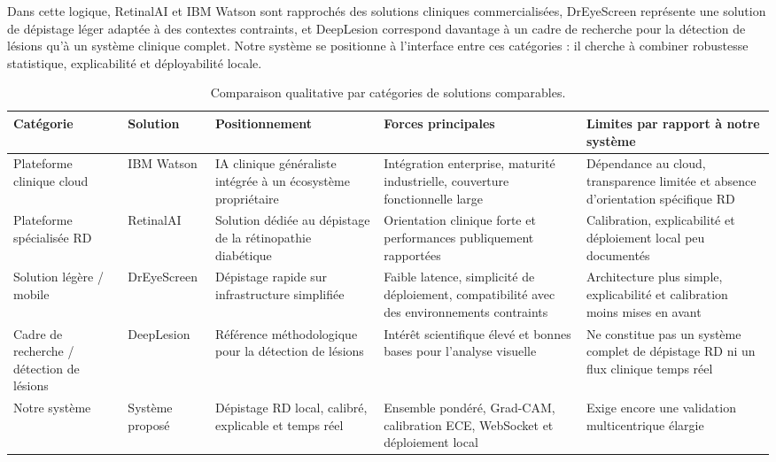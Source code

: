 \documentclass[12pt,a4paper,oneside]{report}
\begin{document}
Dans cette logique, RetinalAI et IBM Watson sont rapprochés des solutions
cliniques commercialisées, DrEyeScreen représente une solution de dépistage
léger adaptée à des contextes contraints, et DeepLesion correspond davantage à
un cadre de recherche pour la détection de lésions qu'à un système clinique
complet. Notre système se positionne à l'interface entre ces catégories : il
cherche à combiner robustesse statistique, explicabilité et déployabilité
locale.

\begin{table}[H]
\centering
\renewcommand{\arraystretch}{1.25}
\caption{Comparaison qualitative par catégories de solutions comparables.}
\label{tab:comparative_apps}
\begin{tabular}{|p{2.6cm}|p{2.7cm}|p{2.8cm}|p{3.0cm}|p{3.1cm}|}
\hline
\textbf{Catégorie} & \textbf{Solution} & \textbf{Positionnement} & \textbf{Forces principales} & \textbf{Limites par rapport à notre système} \\
\hline
Plateforme clinique cloud & IBM Watson & IA clinique généraliste intégrée à un écosystème propriétaire & Intégration enterprise, maturité industrielle, couverture fonctionnelle large & Dépendance au cloud, transparence limitée et absence d'orientation spécifique RD \\
\hline
Plateforme spécialisée RD & RetinalAI & Solution dédiée au dépistage de la rétinopathie diabétique & Orientation clinique forte et performances publiquement rapportées & Calibration, explicabilité et déploiement local peu documentés \\
\hline
Solution légère / mobile & DrEyeScreen & Dépistage rapide sur infrastructure simplifiée & Faible latence, simplicité de déploiement, compatibilité avec des environnements contraints & Architecture plus simple, explicabilité et calibration moins mises en avant \\
\hline
Cadre de recherche / détection de lésions & DeepLesion & Référence méthodologique pour la détection de lésions & Intérêt scientifique élevé et bonnes bases pour l'analyse visuelle & Ne constitue pas un système complet de dépistage RD ni un flux clinique temps réel \\
\hline
Notre système & Système proposé & Dépistage RD local, calibré, explicable et temps réel & Ensemble pondéré, Grad-CAM, calibration ECE, WebSocket et déploiement local & Exige encore une validation multicentrique élargie \\
\hline
\end{tabular}
\end{table}
\end{document}
